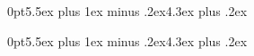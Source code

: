 \usepackage[dvipsnames]{xcolor}
\usepackage{amsfonts}
\usepackage{mathrsfs}
\usepackage{subfiles}
\usepackage{mathtools}
\usepackage{setspace}
\usepackage[utf8]{inputenc}
\usepackage{hyperref}
\usepackage{titlesec}
\usepackage{tocloft}


\titlespacing*{\section}
{0pt}{5.5ex plus 1ex minus .2ex}{4.3ex plus .2ex}


\titlespacing*{\subsection}
{0pt}{5.5ex plus 1ex minus .2ex}{4.3ex plus .2ex}

\hypersetup{
	colorlinks=true, %
	linktoc=all,     %
	linkcolor=blue,  %
}

\doublespacing
